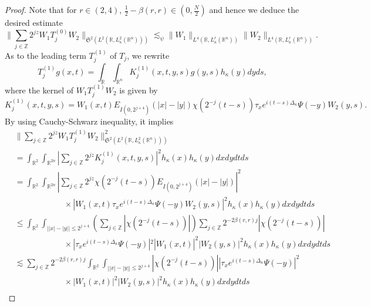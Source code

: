 \documentclass[a4paper,11pt, reqno]{amsart}
\numberwithin{equation}{section}
\theoremstyle{plain}
\theoremstyle{definition}
\theoremstyle{remark}
\begin{document}
\begin{proof}
Note that for $r\in (2,4)$, $\frac{1}{2}-\beta(r,r)\in (0,\frac{N}{2})$ and hence we deduce the desired estimate
\begin{equation*}
    \big\|\sum\limits_{j\in\mathbb{Z}} 2^{jz}W_1T^{(0)}_jW_2\big\|_{\mathfrak{S}^{2}(L^2(\mathbb{R}, L_\kappa^2(\mathbb{R}^n)))}\lesssim_\psi \|W_1\|_{L^4(\mathbb{R},L^r_\kappa(\mathbb{R}^n))}\|W_2\|_{L^4(\mathbb{R},L^r_\kappa(\mathbb{R}^n))}.
\end{equation*}
As to the leading term $T_j^{(1)}$ of $T_j$, we rewrite 
\begin{equation*}
T^{(1)}_jg(x,t)=\int_\mathbb{R}\int_{\mathbb{R}^n}K^{(1)}_j(x,t,y,s) g(y,s)h_\kappa(y)dyds,
\end{equation*}
where the kernel of $W_1T^{(1)}_j W_2$ is given by
\begin{equation*}
    K^{(1)}_j(x,t,y,s)=W_1(x,t)E_{I(0,2^{j+4})}(|x|-|y|)\chi\left(2^{-j}(t-s)\right)\tau_x e^{i(t-s)\Delta_\kappa} \Psi(-y)W_2(y,s).
\end{equation*}
By using Cauchy-Schwarz inequality, it implies
\begin{align*}
    &\big\|\sum\limits_{j\in\mathbb{Z}} 2^{jz}W_1T^{(1)}_jW_2\big\|^2_{\mathfrak{S}^{2}(L^2(\mathbb{R}, L_\kappa^2(\mathbb{R}^n)))}\\
&=\int_{\mathbb{R}^2}\int_{\mathbb{R}^{2n}}\left|\sum\limits_{j\in\mathbb{Z}} 2^{jz}K^{(1)}_j(x,t,y,s)\right|^2h_\kappa(x) h_\kappa(y)dxdydtds\\
&=\int_{\mathbb{R}^2}\int_{\mathbb{R}^{2n}}\left|\sum\limits_{j\in\mathbb{Z}} 2^{jz}\chi\left(2^{-j}(t-s)\right)E_{I(0,2^{j+4})}(|x|-|y|)\right|^2\\
&\qquad\qquad\qquad\times \left|W_1(x,t)\tau_x e^{i(t-s)\Delta_\kappa} \Psi(-y)W_2(y,s)\right|^2h_\kappa(x) h_\kappa(y)dxdydtds\\
&\leq \int_{\mathbb{R}^2}\int_{\left||x|-|y|\right|\leq 2^{j+4}}\left(\sum\limits_{j\in\mathbb{Z}} 
|\chi\left(2^{-j}(t-s)\right)|\right)\sum\limits_{j\in\mathbb{Z}} 2^{-2\beta(r,r)j}|\chi\left(2^{-j}(t-s)\right)|\\
&\qquad\qquad\qquad\times \left|\tau_xe^{i(t-s)\Delta_\kappa} \Psi(-y)|^2|W_1(x,t)\right|^2|W_2(y,s)|^2h_\kappa(x) h_\kappa(y)dxdydtds\\
&\lesssim \sum\limits_{j\in\mathbb{Z}} 2^{-2\beta(r,r)j}\int_{\mathbb{R}^2}\int_{\left||x|-|y|\right|\leq 2^{j+4}}|\chi\left(2^{-j}(t-s)\right)|\left|\tau_x e^{i(t-s)\Delta_\kappa} \Psi(-y)\right|^2\\
&\qquad\qquad\qquad\times|W_1(x,t)|^2|W_2(y,s)|^2h_\kappa(x) h_\kappa(y)dxdydtds\\

\end{align*}
\end{proof}
\end{document}
